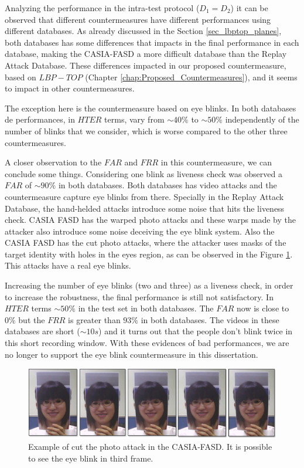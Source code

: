 Analyzing the performance in the intra-test protocol ($D_1 = D_2$) it can be observed that different countermeasures have different performances using different databases. As already discussed in the Section \ref{sec_lbptop_planes}, both databases has some differences that impacts in the final performance in each database, making the CASIA-FASD a more difficult database than the Replay Attack Database. These differences impacted in our proposed countermeasure, based on $LBP-TOP$ (Chapter \ref{chap:Proposed_Countermeasures}), and it seems to impact in other countermeasures.

The exception here is the countermeasure based on eye blinks. In both databases de performances, in $HTER$ terms, vary from $\sim40\%$ to $\sim50\%$ independently of the number of blinks that we consider, which is worse compared to the other three countermeasures.

A closer observation to the $FAR$ and $FRR$ in this countermeasure, we can conclude some things.  Considering one blink as liveness check was observed a $FAR$ of $\sim 90\%$ in both databases. Both databases has video attacks and the countermeasure capture eye blinks from there. Specially in the Replay Attack Database, the hand-helded attacks introduce some noise that hits the liveness check. CASIA FASD has the warped photo attacks and these warps made by the attacker also introduce some noise deceiving the eye blink system. Also the CASIA FASD has the cut photo attacks, where the attacker uses masks of the target identity with holes in the eyes region, as can be observed in the Figure \ref{fig:blink_scene}. This attacks have a real eye blinks. 

Increasing the number of eye blinks (two and three) as a liveness check, in order to increase the robustness, the final performance is still not satisfactory. In $HTER$ terms $\sim 50\%$ in the test set in both databases. The $FAR$ now is close to $0\%$ but the $FRR$ is greater than $93\%$ in both databases. The videos in these databases are short ($\sim10s$) and it turns out that the people don't blink twice in this short recording window. With these evidences of bad performances, we are no longer to support the eye blink countermeasure in this dissertation.

\begin{figure}[!btb]
\begin{center}
\includegraphics [width=15cm] {images/blink_scene.pdf}
\caption[Example of the cut photo attack in the CASIA-FASD]{Example of cut the photo attack in the CASIA-FASD. It is possible to see the eye blink in third frame.}
\label{fig:blink_scene}
\end{center}
\end{figure}

